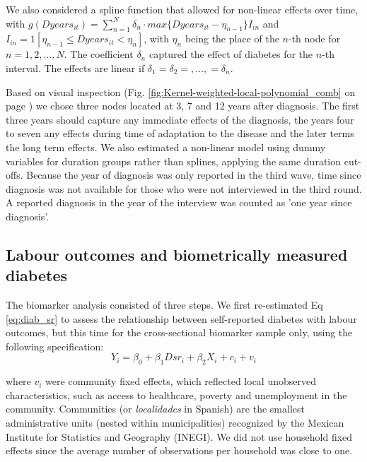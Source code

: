 \documentclass[12pt,english]{article}
\begin{document}
We also considered a spline function that allowed for non-linear effects over time, with $g(Dyears_{it})=\sum_{n=1}^{N}\delta_{n}\cdot max\{Dyears_{it}-\eta_{n-1}\}I_{in}$
and $I_{in}=1[\eta_{n-1}\leq Dyears_{it}<\eta_{n}]$, with $\eta_{n}$ being the place of the $n$-th node for $n=1,2,\ldots,N$. The coefficient $\delta_{n}$ captured the effect of diabetes for the $n$-th interval. The effects are linear if $\delta_{1}=\delta_{2}=,\ldots,=\delta_{n}$.

Based on visual inspection (Fig. \ref{fig:Kernel-weighted-local-polynomial_comb} on page \pageref{fig:Kernel-weighted-local-polynomial_comb}) we chose three nodes located at 3, 7 and 12 years after diagnosis. The first three years should capture any immediate effects of the diagnosis, the years four to seven any effects during time of adaptation to the disease and the later terms the long term effects. We also estimated a non-linear model using dummy variables for duration groups rather than splines, applying the same duration cut-offs. Because the year of diagnosis was only reported in the third wave, time since diagnosis was not available for those who were not interviewed in the third round.  A reported diagnosis in the year of the interview was counted as 'one year since diagnosis'.

\subsection{\label{sec:Biomarker Strategy}Labour outcomes and biometrically measured diabetes}

The biomarker analysis consisted of three steps. We first re-estimated Eq \ref{eq:diab_sr} to assess the relationship between self-reported diabetes with labour outcomes, but this time for the cross-sectional biomarker sample only, using the following specification:
\begin{equation}
Y_{i}=\beta_{0}+\beta_{1}Dsr_{i}+\beta_{2}X_{i}+c_{i}+v_{i}\label{eq:diab_sr}
\end{equation}

where $v_{i}$ were community fixed effects, which reflected local unobserved characteristics, such as access to healthcare, poverty and unemployment in the community. Communities (or \textit{localidades} in Spanish) are the smallest administrative units (nested within municipalities) recognized by the Mexican Institute for Statistics and Geography (INEGI). We did not use household fixed effects since the average number of observations per household was close to one.
\end{document}
